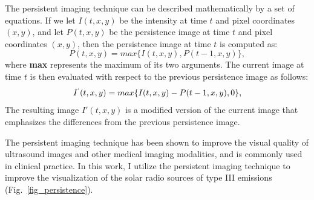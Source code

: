 The persistent imaging technique can be described mathematically by a set of equations. If we let $I(t,x,y)$ be the intensity at time $t$ and pixel coordinates $(x,y)$, and let $P(t,x,y)$ be the persistence image at time $t$ and pixel coordinates $(x,y)$, then the persistence image at time $t$ is computed as:
\begin{equation}
	P(t,x,y) = max\{I(t,x,y), P(t-1,x,y)\}
	,\end{equation}
where \textbf{max} represents the maximum of its two arguments. The current image at time $t$ is then evaluated with respect to the previous persistence image as follows:
\begin{equation}
	I^`(t,x,y) = max\{I(t,x,y) - P(t-1,x,y), 0\}
	,\end{equation}
The resulting image $I'(t,x,y)$ is a modified version of the current image that emphasizes the differences from the previous persistence image.

The persistent imaging technique has been shown to improve the visual quality of ultrasound images and other medical imaging modalities, and is commonly used in clinical practice. In this work, I utilize the persistent imaging technique to improve the visualization of the solar radio sources of type III emissions (Fig.~\ref{fig_persistence}).

